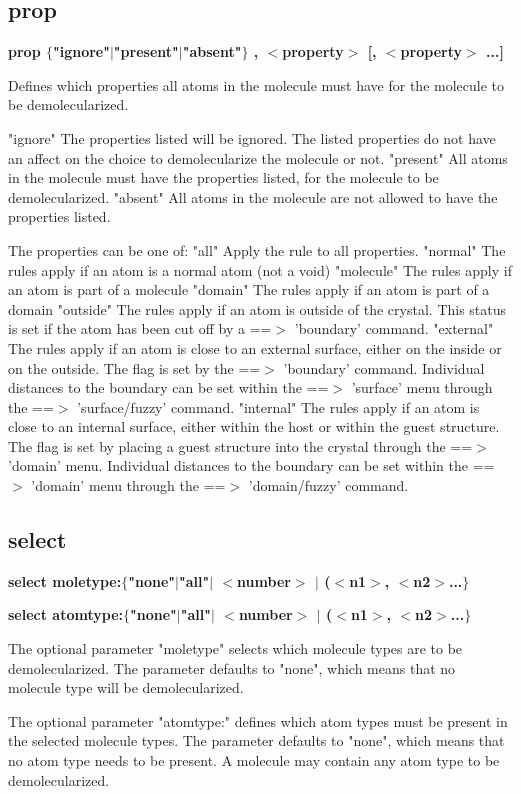 \subsection*{prop}
{\bf prop $ \{$"ignore"$| $"present"$| $"absent"$\} $ , $ <$property$> $ [, $ <$property$> $ ...] \par }
\par
\vspace{3pt}
Defines which properties all atoms in the molecule must have 
for the molecule to be demolecularized. 
\par
"ignore" 
The properties listed will be ignored. The listed properties do 
not have an affect on the choice to demolecularize the molecule 
or not. 
"present" 
All atoms in the molecule must have the properties listed, 
for the molecule to be demolecularized. 
"absent" 
All atoms in the molecule are not allowed to have the 
properties listed. 
\par
The properties can be one of: 
"all" 
Apply the rule to all properties. 
"normal" 
The rules apply if an atom is a normal atom (not a void) 
"molecule" 
The rules apply if an atom is part of a molecule 
"domain" 
The rules apply if an atom is part of a domain 
"outside" 
The rules apply if an atom is outside of the crystal. This status 
is set if the atom has been cut off by a ==$> $ 'boundary' command. 
"external" 
The rules apply if an atom is close to an external surface, either 
on the inside or on the outside. 
The flag is set by the ==$> $ 'boundary' command. Individual distances 
to the boundary can be set within the ==$> $ 'surface' menu through 
the ==$> $ 'surface/fuzzy' command. 
"internal" 
The rules apply if an atom is close to an internal surface, either 
within the host or within the guest structure. 
The flag is set by placing a guest structure into the crystal through 
the ==$> $ 'domain' menu. Individual distances 
to the boundary can be set within the ==$> $ 'domain' menu through 
the ==$> $ 'domain/fuzzy' command. 
\subsection*{select}
{\bf select moletype:$ \{$"none"$| $"all"$| $ $ <$number$> $ $| $ ($ <$n1$> $, $ <$n2$> $...$\} $ \par }
{\bf select atomtype:$ \{$"none"$| $"all"$| $ $ <$number$> $ $| $ ($ <$n1$> $, $ <$n2$> $...$\} $ \par }
\par
\vspace{3pt}
The optional parameter "moletype" selects which molecule 
types are to be demolecularized. 
The parameter defaults to "none", which means that no 
molecule type will be demolecularized. 
\par
The optional parameter "atomtype:" defines which atom 
types must be present in the selected molecule types. 
The parameter defaults to "none", which means that no 
atom type needs to be present. A molecule may contain 
any atom type to be demolecularized. 
